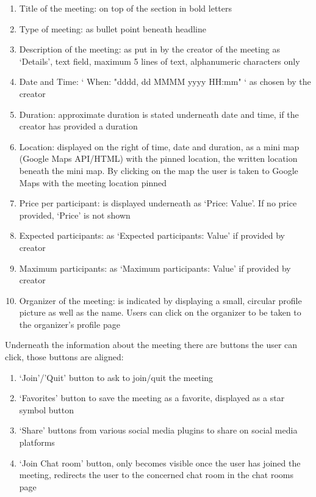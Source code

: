 \documentclass[conference]{IEEEtran}
\begin{document}
\begin{enumerate}
    \item Title of the meeting: on top of the section in bold letters
    \item Type of meeting: as bullet point beneath headline
    \item Description of the meeting: as put in by the creator of the meeting as ‘Details’, text field, maximum 5 lines of text, alphanumeric characters only
    \item Date and Time: ‘ When: "dddd, dd MMMM yyyy HH:mm" ‘ as chosen by the creator
    \item Duration: approximate duration is stated underneath date and time, if the creator has provided a duration
    \item Location: displayed on the right of time, date and duration, as a mini map (Google Maps API/HTML) with the pinned location, the written location beneath the mini map. By clicking on the map the user is taken to Google Maps with the meeting location pinned
    \item Price per participant: is displayed underneath as ‘Price: Value’. If no price provided, ‘Price’ is not shown
    \item Expected participants: as ‘Expected participants: Value’ if provided by creator
    \item Maximum participants: as ‘Maximum participants: Value’ if provided by creator
    \item Organizer of the meeting: is indicated by displaying a small, circular profile picture as well as the name. Users can click on the organizer to be taken to the organizer's profile page
\end{enumerate}

Underneath the information about the meeting there are buttons the user can click, those buttons are aligned:

\begin{enumerate}
    \item ‘Join’/'Quit' button to ask to join/quit the meeting
    \item ‘Favorites’ button to save the meeting as a favorite, displayed as a star symbol button
    \item ‘Share’ buttons from various social media plugins to share on social media platforms
    \item ‘Join Chat room’ button, only becomes visible once the user has joined the meeting, redirects the user to the concerned chat room in the chat rooms page
\end{enumerate}
\end{document}
